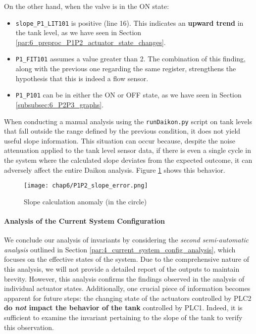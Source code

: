 \noindent On the other hand, when the valve is in the ON state:

\begin{itemize}
	\item \texttt{slope\_P1\_LIT101} is positive (line 16). This indicates an \textbf{upward trend} in the tank level, as we have seen in Section \ref{par:6_preproc_P1P2_actuator_state_changes}.
	\item \texttt{P1\_FIT101} assumes a value greater than 2. The combination of this finding, along with the previous one regarding the same register, strengthens the hypothesis that this is indeed a flow sensor.
	\item \texttt{P1\_P101} can be in either the ON or OFF state, as we have seen in Section \ref{subsubsec:6_P2P3_graphs}.
\end{itemize}

When conducting a manual analysis using the \texttt{runDaikon.py} script on tank levels that fall outside the range defined by the previous condition, it does not yield useful slope information. This situation can occur because, despite the noise attenuation applied to the tank level sensor data, if there is even a single cycle in the system where the calculated slope deviates from the expected outcome, it can adversely affect the entire Daikon analysis. Figure \ref{fig:6_P1P2_slope_fail} shows this behavior.

\begin{figure}[ht]
	\centering
	\texttt{[image: chap6/P1P2\_slope\_error.png]}
	\caption{Slope calculation anomaly (in the circle)}
	\label{fig:6_P1P2_slope_fail}
\end{figure}

\paragraph{Analysis of the Current System Configuration}
\label{par:6_P1P2_current_system_conf}
We conclude our analysis of invariants by considering the \textit{second semi-automatic analysis} outlined in Section \ref{par:4_current_system_config_analysis}, which focuses on the effective states of the system. Due to the comprehensive nature of this analysis, we will not provide a detailed report of the outputs to maintain brevity. However, this analysis confirms the findings observed in the analysis of individual actuator states. Additionally, one crucial piece of information becomes apparent for future steps: the changing state of the actuators controlled by PLC2 \textbf{do \textit{not} impact the behavior of the tank} controlled by PLC1. Indeed, it is sufficient to examine the invariant pertaining to the slope of the tank to verify this observation.


